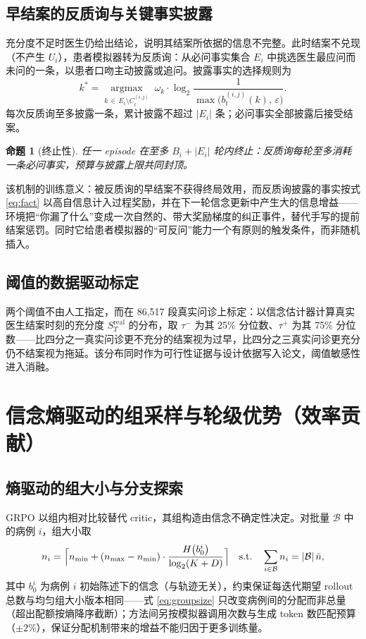 \documentclass[11pt,a4paper]{ctexart}
\newtheorem{proposition}{命题}
\newcommand{\1}[1]{\mathbb{1}\!\left[#1\right]}
\newcommand{\Bcal}{\mathcal{B}}
\begin{document}
\subsection{早结案的反质询与关键事实披露}
充分度不足时医生仍给出结论，说明其结案所依据的信息不完整。此时结案不兑现（不产生 $U_i$），患者模拟器转为反质询：从必问事实集合 $E_i$ 中挑选医生最应问而未问的一条，以患者口吻主动披露或追问。披露事实的选择规则为
\begin{equation}\label{eq:disclose}
k^{\ast}
=\operatorname*{argmax}_{k\,\in\,E_i\setminus C_t^{(i,j)}}
\;\omega_k\cdot\log_2\frac{1}{\max\bigl(b_t^{(i,j)}(k),\,\varepsilon\bigr)}.
\end{equation}
每次反质询至多披露一条，累计披露不超过 $|E_i|$ 条；必问事实全部披露后接受结案。

\begin{proposition}[终止性]\label{prop:termination}
任一 episode 在至多 $B_i+|E_i|$ 轮内终止：反质询每轮至多消耗一条必问事实，预算与披露上限共同封顶。
\end{proposition}

该机制的训练意义：被反质询的早结案不获得终局效用，而反质询披露的事实按式 \eqref{eq:fact} 以高自信息计入过程奖励，并在下一轮信念更新中产生大的信息增益——环境把``你漏了什么''变成一次自然的、带大奖励梯度的纠正事件，替代手写的提前结案惩罚。同时它给患者模拟器的``可反问''能力一个有原则的触发条件，而非随机插入。

\subsection{阈值的数据驱动标定}
两个阈值不由人工指定，而在 86{,}517 段真实问诊上标定：以信念估计器计算真实医生结案时刻的充分度 $S_T^{\mathrm{real}}$ 的分布，取 $\tau^-$ 为其 25\% 分位数、$\tau^+$ 为其 75\% 分位数——比四分之一真实问诊更不充分的结案视为过早，比四分之三真实问诊更充分仍不结案视为拖延。该分布同时作为可行性证据与设计依据写入论文，阈值敏感性进入消融。

\section{信念熵驱动的组采样与轮级优势（效率贡献）}\label{sec:group}

\subsection{熵驱动的组大小与分支探索}
GRPO 以组内相对比较替代 critic，其组构造由信念不确定性决定。对批量 $\Bcal$ 中的病例 $i$，组大小取
\begin{equation}\label{eq:groupsize}
n_i=\Bigl\lceil n_{\min}+(n_{\max}-n_{\min})\cdot
\frac{H\bigl(b_0^{i}\bigr)}{\log_2(K+D)}\Bigr\rceil
\quad\text{s.t.}\quad
\sum_{i\in\Bcal} n_i=\lvert\Bcal\rvert\,\bar n,
\end{equation}
其中 $b_0^{i}$ 为病例 $i$ 初始陈述下的信念（与轨迹无关），约束保证每迭代期望 rollout 总数与均匀组大小版本相同——式 \eqref{eq:groupsize} 只改变病例间的分配而非总量（超出配额按熵降序截断）；方法间另按模拟器调用次数与生成 token 数匹配预算（$\pm2\%$），保证分配机制带来的增益不能归因于更多训练量。
\end{document}
